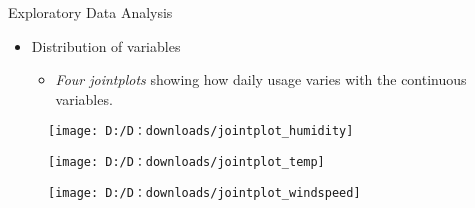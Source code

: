 \documentclass[
 size=14pt,
 paper=smartboard,  %
 mode=present, 		%
 display=slides, 	%
 style=tuliplab,  	%
 pauseslide,
 fleqn,leqno]{powerdot}
\begin{document}
\begin{slide}[toc=,bm=]{Exploratory Data Analysis}
	\begin{itemize}
		\item
		Distribution of variables
		
		\begin{itemize}
			\item
		\emph{Four jointplots} showing  how daily usage varies with the continuous variables.
					
			
		\end{itemize}
	\end{itemize}
	
	\begin{center}
		\begin{minipage}{0.3\linewidth}
			\centering
			
\begin{figure}
	\caption[Total Bike usage vs Humidity]{}
	\label{fig:jointplothumidity}
	\texttt{[image: D:/D：downloads/jointplot\_humidity]}
\end{figure}
		
		\end{minipage}
		\hfill
		\begin{minipage}{0.3\linewidth}
			\centering
			
\begin{figure}
	\caption[Total Bike Usage vs Temperature]{}
	\label{fig:jointplottemp}
	\texttt{[image: D:/D：downloads/jointplot\_temp]}
\end{figure}
				
		
		\end{minipage}
		\hfill
		\begin{minipage}{0.3\linewidth}
			\centering
		
\begin{figure}
	\caption[Total Bike usage vs Wind Speed]{}
	\label{fig:jointplotwindspeed}
	\texttt{[image: D:/D：downloads/jointplot\_windspeed]}
\end{figure}
				
		
		\end{minipage}
	\end{center}
	
	
\end{slide}
\end{document}
